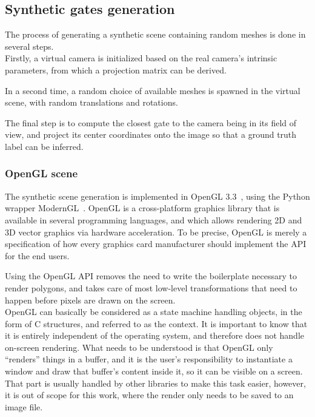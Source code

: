 \subsection{Synthetic gates generation}

The process of generating a synthetic scene containing random meshes is done in
several steps.\\

Firstly, a virtual camera is initialized based on the real camera's intrinsic
parameters, from which a projection matrix can be derived.

In a second time, a random choice of available meshes is spawned in the virtual
scene, with random translations and rotations.

The final step is to compute the closest gate to the camera being in its field
of view, and project its center coordinates onto the image so that a ground
truth label can be inferred.

	\subsubsection{OpenGL scene}

The synthetic scene generation is implemented in OpenGL 3.3~\cite{OpenGL},
using the Python wrapper ModernGL~\cite{ModernGL}.
OpenGL is a cross-platform graphics library that is available in several
programming languages, and which allows rendering 2D and 3D vector graphics via
hardware acceleration. To be precise, OpenGL is merely a specification of how
every graphics card manufacturer should implement the API for the end users.

Using the OpenGL API removes the need to write the boilerplate necessary to
render polygons, and takes care of most low-level transformations that need to
happen before pixels are drawn on the screen.\\


OpenGL can basically be considered as a state machine handling objects, in the
form of C structures, and referred to as the context. It is important to know
that it is entirely independent of the operating system, and therefore does
not handle on-screen rendering. What needs to be understood is that OpenGL only
``renders'' things in a buffer, and it is the user's responsibility to
instantiate a window and draw that buffer's content inside it, so it can be
visible on a screen. That part is usually handled by other libraries to make
this task easier, however, it is out of scope for this work, where the render
only needs to be saved to an image file.\\

